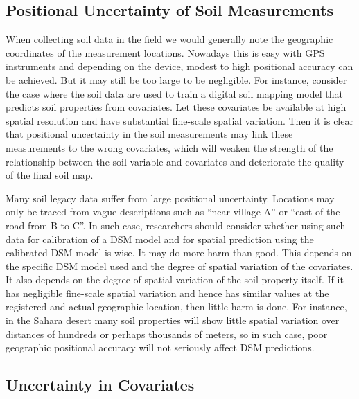 \documentclass[10pt,b5paper,]{book}
\theoremstyle{definition}
\theoremstyle{definition}
\theoremstyle{definition}
\theoremstyle{remark}
\begin{document}
\hypertarget{positional-uncertainty-of-soil-measurements}{%
\subsection{Positional Uncertainty of Soil
Measurements}\label{positional-uncertainty-of-soil-measurements}}

When collecting soil data in the field we would generally note the
geographic coordinates of the measurement locations. Nowadays this is
easy with GPS instruments and depending on the device, modest to high
positional accuracy can be achieved. But it may still be too large to be
negligible. For instance, consider the case where the soil data are used
to train a digital soil mapping model that predicts soil properties from
covariates. Let these covariates be available at high spatial resolution
and have substantial fine-scale spatial variation. Then it is clear that
positional uncertainty in the soil measurements may link these
measurements to the wrong covariates, which will weaken the strength of
the relationship between the soil variable and covariates and
deteriorate the quality of the final soil map.

Many soil legacy data suffer from large positional uncertainty.
Locations may only be traced from vague descriptions such as ``near
village A'' or ``east of the road from B to C''. In such case,
researchers should consider whether using such data for calibration of a
DSM model and for spatial prediction using the calibrated DSM model is
wise. It may do more harm than good. This depends on the specific DSM
model used and the degree of spatial variation of the covariates. It
also depends on the degree of spatial variation of the soil property
itself. If it has negligible fine-scale spatial variation and hence has
similar values at the registered and actual geographic location, then
little harm is done. For instance, in the Sahara desert many soil
properties will show little spatial variation over distances of hundreds
or perhaps thousands of meters, so in such case, poor geographic
positional accuracy will not seriously affect DSM predictions.

\hypertarget{uncertainty-in-covariates}{%
\subsection{Uncertainty in Covariates}\label{uncertainty-in-covariates}}
\end{document}

